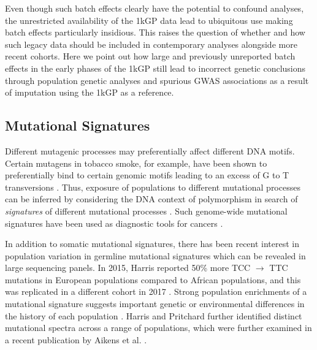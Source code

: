 \documentclass[9pt,lineno]{elife}
\begin{document}
Even though such batch effects clearly have the potential to confound analyses, the unrestricted availability of the 1kGP data lead to ubiquitous use making batch effects particularly insidious.   
This raises the question of whether and how such legacy data should be included in contemporary analyses alongside more recent cohorts.
Here we point out how large and previously unreported batch effects in the early phases of the 1kGP still lead to incorrect genetic conclusions through population genetic analyses and spurious GWAS associations as a result of imputation using the 1kGP as a reference.

\subsection{Mutational Signatures}

Different mutagenic processes may preferentially affect different DNA motifs. 
Certain mutagens in tobacco smoke, for example, have been shown to preferentially bind to certain genomic motifs leading to an excess of G to T transversions \citep{Pfeifer2002,Pleasance2010}. 
Thus, exposure of populations to different mutational processes can be inferred by considering the DNA context of polymorphism in search of \textit{signatures} of different mutational processes \citep{Alexandrov2013,Shiraishi2015a}. 
Such genome-wide mutational signatures have been used as diagnostic tools for cancers \citep{Alexandrov2013,Shiraishi2015a}.

In addition to somatic mutational signatures, there has been recent interest in population variation in germline mutational signatures which can be revealed in large sequencing panels. 
In 2015, Harris reported 50\% more TCC ${\rightarrow}$ TTC mutations in European populations compared to African populations, and this was replicated in a different cohort in 2017 \citep{Harris2015a, Harris2017a, Mathieson2017a}. 
Strong population enrichments of a mutational signature suggests important genetic or environmental differences in the history of each population \citep{Harris2015a, Harris2017a}. 
Harris and Pritchard further identified distinct mutational spectra across a range of populations, which were further examined in a recent publication by Aikens et al. \citep{Harris2017a,Aikens2018}.
 
\end{document}
